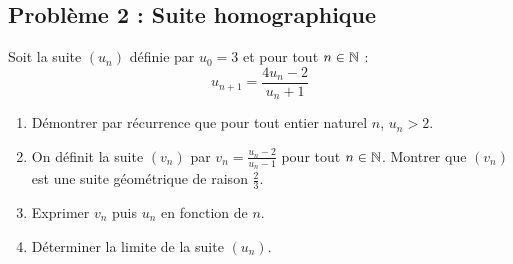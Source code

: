\subsection*{Problème 2 : Suite homographique}
Soit la suite $(u_n)$ définie par $u_0 = 3$ et pour tout $n \in \mathbb{N}$ :
\[
u_{n+1} = \frac{4u_n - 2}{u_n + 1}
\]
\begin{enumerate}
    \item Démontrer par récurrence que pour tout entier naturel $n$, $u_n > 2$.
    \item On définit la suite $(v_n)$ par $v_n = \frac{u_n - 2}{u_n - 1}$ pour tout $n \in \mathbb{N}$.
    Montrer que $(v_n)$ est une suite géométrique de raison $\frac{2}{3}$.
    \item Exprimer $v_n$ puis $u_n$ en fonction de $n$.
    \item Déterminer la limite de la suite $(u_n)$.
\end{enumerate}

